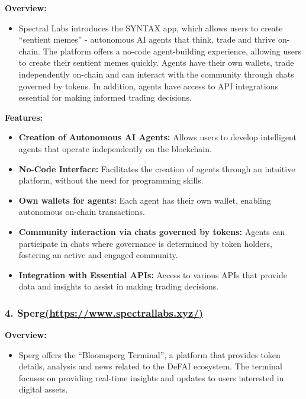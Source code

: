 \documentclass[
]{article}
\providecommand{\tightlist}{%
  \setlength{\itemsep}{0pt}\setlength{\parskip}{0pt}}
\begin{document}
\textbf{Overview:}

\begin{itemize}
\tightlist
\item
  Spectral Labs introduces the SYNTAX app, which allows users to create
  ``sentient memes'' - autonomous AI agents that think, trade and thrive
  on-chain. The platform offers a no-code agent-building experience,
  allowing users to create their sentient memes quickly. Agents have
  their own wallets, trade independently on-chain and can interact with
  the community through chats governed by tokens. In addition, agents
  have access to API integrations essential for making informed trading
  decisions.
\end{itemize}

\textbf{Features:}

\begin{itemize}
\tightlist
\item
  \textbf{Creation of Autonomous AI Agents:} Allows users to develop
  intelligent agents that operate independently on the blockchain.
\item
  \textbf{No-Code Interface:} Facilitates the creation of agents through
  an intuitive platform, without the need for programming skills.
\item
  \textbf{Own wallets for agents:} Each agent has their own wallet,
  enabling autonomous on-chain transactions.
\item
  \textbf{Community interaction via chats governed by tokens:} Agents
  can participate in chats where governance is determined by token
  holders, fostering an active and engaged community.
\item
  \textbf{Integration with Essential APIs:} Access to various APIs that
  provide data and insights to assist in making trading decisions.
\end{itemize}

\hypertarget{sperghttpswww.spectrallabs.xyz}{%
\subsubsection{\texorpdfstring{4.
Sperg\href{https://www.spectrallabs.xyz/}{(https://www.spectrallabs.xyz/)}}{4. Sperg(https://www.spectrallabs.xyz/)}}\label{sperghttpswww.spectrallabs.xyz}}

\textbf{Overview:}

\begin{itemize}
\tightlist
\item
  Sperg offers the ``Bloomsperg Terminal'', a platform that provides
  token details, analysis and news related to the DeFAI ecosystem. The
  terminal focuses on providing real-time insights and updates to users
  interested in digital assets.
\end{itemize}
\end{document}
